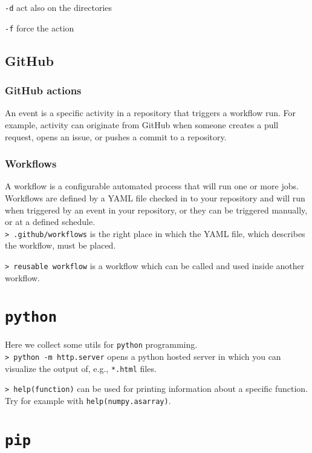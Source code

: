 \documentclass[11pt]{article}
\newcommand{\cmd}[1]{\colorbox{light-gray}{\textcolor{gio}{\texttt{#1}}}}
\begin{document}
\begin{multicols}{2}
\cmd{-d} act also on the directories

\cmd{-f} force the action

\subsection{GitHub}

\subsubsection{GitHub actions}

An event is a specific activity in a repository that triggers a workflow run. For example, activity can originate from GitHub when someone creates a pull request, opens an issue, or pushes a commit to a repository.

\subsubsection{Workflows}

A workflow is a configurable automated process that will run one or more jobs. Workflows are defined by a YAML file checked in to your repository and will run when triggered by an event in your repository, or they can be triggered manually, or at a defined schedule. \\

\cmd{> .github/workflows} is the right place in which the YAML file, which describes the workflow, must be placed.

\cmd{> reusable workflow} is a workflow which can be called and used inside another workflow.

\section{\texttt{python}}

Here we collect some utils for \texttt{python} programming. \\

\cmd{> python -m http.server} opens a python hosted server in which you can visualize the output of, e.g., \texttt{*.html} files.

\cmd{> help(function)} can be used for printing information about a specific function.
Try for example with \texttt{help(numpy.asarray)}.

\section{\texttt{pip}}


\end{multicols}
\end{document}
